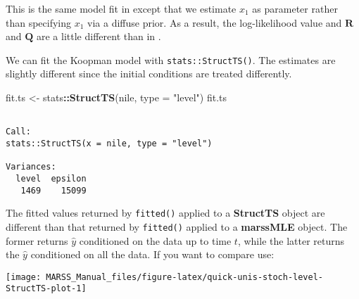 \documentclass[12pt,]{book}
\newenvironment{Shaded}{\begin{snugshade}}{\end{snugshade}}
\newcommand{\DataTypeTok}[1]{\textcolor[rgb]{0.13,0.29,0.53}{#1}}
\newcommand{\DecValTok}[1]{\textcolor[rgb]{0.00,0.00,0.81}{#1}}
\newcommand{\KeywordTok}[1]{\textcolor[rgb]{0.13,0.29,0.53}{\textbf{#1}}}
\newcommand{\NormalTok}[1]{#1}
\newcommand{\OperatorTok}[1]{\textcolor[rgb]{0.81,0.36,0.00}{\textbf{#1}}}
\newcommand{\StringTok}[1]{\textcolor[rgb]{0.31,0.60,0.02}{#1}}
\begin{document}
This is the same model fit in \citet[p. 148]{Koopmanetal1998} except that we estimate \(x_1\) as parameter rather than specifying \(x_1\) via a diffuse prior. As a result, the log-likelihood value and \(\mathbf{R}\) and \(\mathbf{Q}\) are a little different than in \citet{Koopmanetal1998}.

We can fit the Koopman model with \texttt{stats::StructTS()}. The estimates are slightly different since the initial conditions are treated differently.

\begin{Shaded}
\begin{Highlighting}[]
\NormalTok{fit.ts <-}\StringTok{ }\NormalTok{stats}\OperatorTok{::}\KeywordTok{StructTS}\NormalTok{(nile, }\DataTypeTok{type =} \StringTok{"level"}\NormalTok{)}
\NormalTok{fit.ts}
\end{Highlighting}
\end{Shaded}

\begin{verbatim}

Call:
stats::StructTS(x = nile, type = "level")

Variances:
  level  epsilon  
   1469    15099  
\end{verbatim}

The fitted values returned by \texttt{fitted()} applied to a \textbf{StructTS} object are different than that returned by \texttt{fitted()} applied to a \textbf{marssMLE} object. The former returns \(\hat{y}\) conditioned on the data up to time \(t\), while the latter returns the \(\hat{y}\) conditioned on all the data. If you want to compare use:

\begin{Shaded}
\end{Shaded}

\begin{center}\texttt{[image: MARSS\_Manual\_files/figure-latex/quick-unis-stoch-level-StructTS-plot-1]} \end{center}
\end{document}
